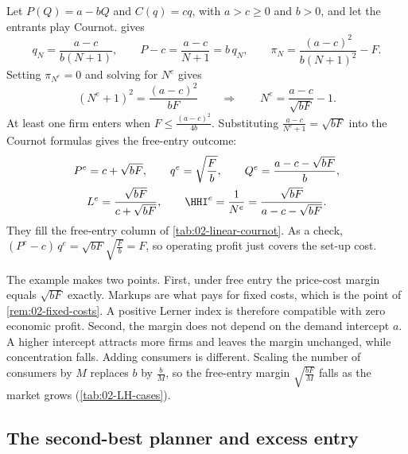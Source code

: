 \begin{example}\label{ex:02-free-entry-linear}
Let $P(Q) = a - bQ$ and $C(q) = cq$, with $a > c \ge 0$ and $b > 0$, and let the entrants play Cournot.
 gives
\begin{equation*}
q_N = \frac{a - c}{b(N + 1)}, \qquad P - c = \frac{a - c}{N + 1} = b\, q_N, \qquad
\pi_N = \frac{(a - c)^2}{b(N + 1)^2} - F .
\end{equation*}
Setting $\pi_{N^e} = 0$ and solving for $N^e$ gives
\begin{equation}\label{eq:02-Ne-linear}
(N^e + 1)^2 = \frac{(a - c)^2}{bF}
\qquad\Longrightarrow\qquad
N^e = \frac{a - c}{\sqrt{bF}} - 1 .
\end{equation}
At least one firm enters when $F \le \frac{(a - c)^2}{4b}$. Substituting $\frac{a - c}{N^e + 1} = \sqrt{bF}$ into
the Cournot formulas gives the free-entry outcome:
\begin{gather*}
P^e = c + \sqrt{bF}, \qquad q^e = \sqrt{\frac{F}{b}}, \qquad Q^e = \frac{a - c - \sqrt{bF}}{b}, \\
L^e = \frac{\sqrt{bF}}{c + \sqrt{bF}}, \qquad \HHI^e = \frac{1}{N^e} = \frac{\sqrt{bF}}{a - c - \sqrt{bF}} .
\end{gather*}
They fill the free-entry column of \cref{tab:02-linear-cournot}. As a check, $(P^e - c)\, q^e = \sqrt{bF}
\sqrt{\frac{F}{b}} = F$, so operating profit just covers the set-up cost.
\end{example}

The example makes two points. First, under free entry the price-cost margin equals $\sqrt{bF}$ exactly. Markups are
what pays for fixed costs, which is the point of \cref{rem:02-fixed-costs}. A positive
Lerner index is therefore compatible with zero economic profit. Second, the margin does not depend on the demand
intercept $a$. A higher intercept attracts more firms and leaves the margin unchanged, while concentration falls.
Adding consumers is different. Scaling the number of consumers by $M$ replaces $b$ by $\frac{b}{M}$, so the
free-entry margin $\sqrt{\frac{bF}{M}}$ falls as the market grows (\cref{tab:02-LH-cases}).

\subsection{The second-best planner and excess entry}\label{sec:02-mw}

